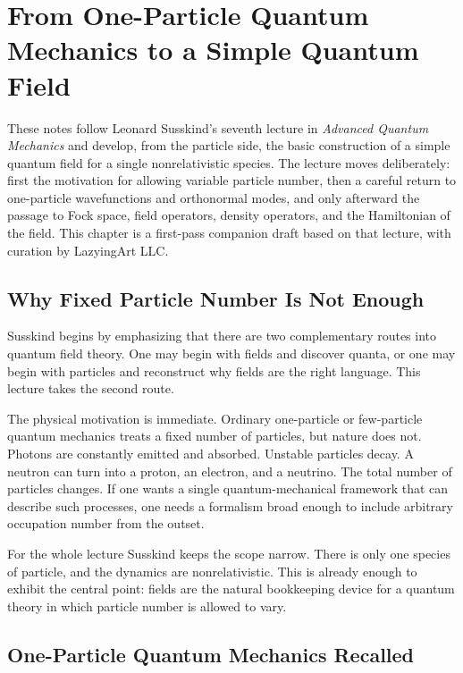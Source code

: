 \chapter{From One-Particle Quantum Mechanics to a Simple Quantum Field}

These notes follow Leonard Susskind's seventh lecture in \emph{Advanced Quantum Mechanics} and develop, from the particle side, the basic construction of a simple quantum field for a single nonrelativistic species. The lecture moves deliberately: first the motivation for allowing variable particle number, then a careful return to one-particle wavefunctions and orthonormal modes, and only afterward the passage to Fock space, field operators, density operators, and the Hamiltonian of the field. This chapter is a first-pass companion draft based on that lecture, with curation by LazyingArt LLC.

\section{Why Fixed Particle Number Is Not Enough}

Susskind begins by emphasizing that there are two complementary routes into quantum field theory. One may begin with fields and discover quanta, or one may begin with particles and reconstruct why fields are the right language. This lecture takes the second route.

The physical motivation is immediate. Ordinary one-particle or few-particle quantum mechanics treats a fixed number of particles, but nature does not. Photons are constantly emitted and absorbed. Unstable particles decay. A neutron can turn into a proton, an electron, and a neutrino. The total number of particles changes. If one wants a single quantum-mechanical framework that can describe such processes, one needs a formalism broad enough to include arbitrary occupation number from the outset.

For the whole lecture Susskind keeps the scope narrow. There is only one species of particle, and the dynamics are nonrelativistic. This is already enough to exhibit the central point: fields are the natural bookkeeping device for a quantum theory in which particle number is allowed to vary.

\section{One-Particle Quantum Mechanics Recalled}

